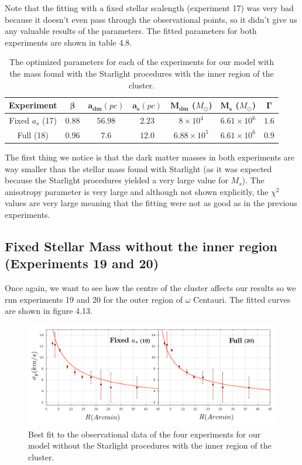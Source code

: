 Note that the fitting with a fixed stellar scalength (experiment 17) was very bad because it doesn't even pass through the observational points, so it didn't give us any valuable results of the parameters. The fitted parameters for both experiments are shown in table 4.8. 

\begin{table}[]
\centering
\begin{tabular}{| c| c| c| c| c| c| c|}
    \hline
    \textbf{Experiment} & $\mathbf{\beta}$ & $\mathbf{a_{dm}} (pc)$ & $\mathbf{a_{s}} (pc)$ & $\mathbf{M_{dm}}$ ($M_{\odot}$) & $\mathbf{M_{s}}$ ($M_{\odot}$) & $\mathbf{\Gamma}$\\ \hline
	Fixed $a_s$ (17) &	$0.88$ &	$56.98$ &	$2.23$ &	$8 \times 10^{4}$ &	$6.61 \times 10 ^{6}$ &	$1.6$\\ \hline
	Full (18) &	$0.96$ &	$7.6$ &	$12.0$ &	$6.88 \times 10^{5}$ &	$6.61 \times 10^{6}$ &	$0.9$\\ \hline
  \end{tabular} 
\caption[Optimized parameters for our model with the mass found with the Starlight procedures with the inner region.]{The optimized parameters for each of the experiments for our model with the mass found with the Starlight procedures with the inner region of the cluster.}
\end{table}

The first thing we notice is that the dark matter masses in both experiments are way smaller than the stellar mass found with Starlight (as it was expected because the Starlight procedures yielded a very large value for $M_s$). The anisotropy parameter is very large and although not shown explicitly, the $\chi^{2}$ values are very large meaning that the fitting were not as good as in the previous experiments.

\subsection{Fixed Stellar Mass without the inner region (Experiments 19 and 20)}

Once again, we want to see how the centre of the cluster affects our results so we run experiments 19 and 20 for the outer region of $\omega$ Centauri. The fitted curves are shown in figure 4.13. 

\begin{figure}[H]
\centering
\includegraphics[width=15cm]{images/Starlight_1.png}
\caption[Best fit of our model with the mass found with the Starlight procedures without the inner region]{Best fit to the observational data of the four experiments for our model without the Starlight procedures with the inner region of the cluster.}
\end{figure}

